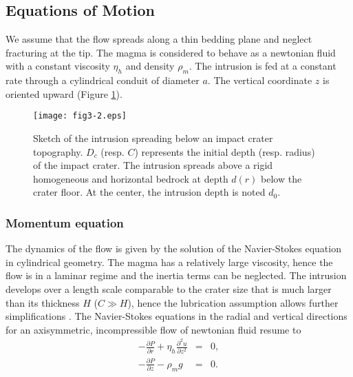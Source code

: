 \subsection{Equations of Motion}
	
We assume that the flow spreads along a thin bedding plane and neglect
fracturing  at the  tip.   The  magma is  considered  to  behave as  a
newtonian  fluid   with  a   constant  viscosity  $\eta_h$   and  density
$\rho_{m}$.   The  intrusion is  fed  at  a  constant rate  through  a
cylindrical conduit of  diameter $a$.  The vertical  coordinate $z$ is
oriented upward (Figure \ref{C5-fig3-2}).

\begin{figure}[h!]
  \graphicspath{ {/Users/thorey/Documents/These/Submission/Article/FFC_JGR_2013/Paper_APRES_2nd_REVIEW/} }
  \begin{center}
    \texttt{[image: fig3-2.eps]}
    \caption{Sketch of the intrusion  spreading below an impact crater
      topography.  $D_{c}$  (resp.  $C$) represents the  initial depth
      (resp. radius) of the impact crater. The intrusion spreads above
      a rigid  homogeneous and horizontal bedrock  at depth $d(r)$
      below the  crater floor. At  the center, the intrusion  depth is
      noted $d_0$.}
    \label{C5-fig3-2}
  \end{center}
\end{figure}

 	
\subsubsection{Momentum equation}
\label{C5-Equation_Momentum}
	
The dynamics of the flow is given by the solution of the Navier-Stokes
equation in  cylindrical geometry.  The  magma has a  relatively large
viscosity, hence the flow is in a laminar regime and the inertia terms
can  be  neglected.   The  intrusion  develops  over  a  length  scale
comparable to the  crater size that is much larger  than its thickness
$H$  ($C \gg  H$),  hence the  lubrication  assumption allows  further
simplifications       \citep{Huppert:1982a,Michaut:2009jx}.        The
Navier-Stokes equations in  the radial and vertical  directions for an
axisymmetric, incompressible flow of newtonian fluid resume to
\begin{eqnarray}
  -\frac{\partial P}{\partial r} + \eta_h \frac{\partial^{2}u}{\partial z^{2}} &=&0\label{C5-eq4}, \\
  -\frac{\partial P}{\partial z} - \rho_{m}g& =&0.
                                                 \label{C5-eq5}
\end{eqnarray}

